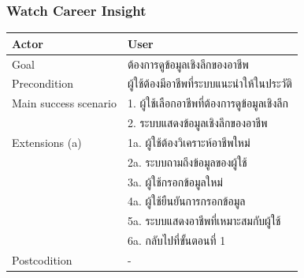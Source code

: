\subsubsection{Watch Career Insight}
\begin{table}[H]
    \begin{tabularx}{\textwidth}{|l|X|} \hline
        Actor                 & User                  \\ \hline
        Goal                  & ต้องการดูข้อมูลเชิงลึกของอาชีพ         \\ \hline
        Precondition          & ผู้ใช้ต้องมีอาชีพที่ระบบแนะนำให้ในประวัติ          \\ \hline
        Main success scenario & 1. ผู้ใช้เลือกอาชีพที่ต้องการดูข้อมูลเชิงลึก \\
        & 2. ระบบแสดงข้อมูลเชิงลึกของอาชีพ     \\ \hline
        Extensions (a)        & 1a. ผู้ใช้ต้องวิเคราะห์อาชีพใหม่        \\
        & 2a. ระบบถามถึงข้อมูลของผู้ใช้         \\
        & 3a. ผู้ใช้กรอกข้อมูลใหม่              \\
        & 4a. ผู้ใช้ยืนยันการกรอกข้อมูล          \\
        & 5a. ระบบแสดงอาชีพที่เหมาะสมกับผู้ใช้   \\
        & 6a. กลับไปที่ขั้นตอนที่ 1              \\ \hline
        Postcodition          & -                               \\ \hline
    \end{tabularx}
\end{table}



